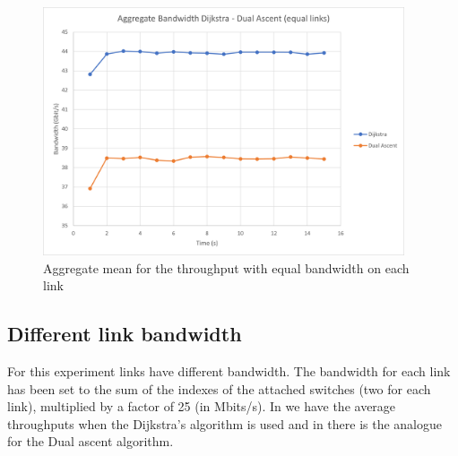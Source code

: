 \begin{figure}[hbt]
	\centering
	\includegraphics[width=0.95\textwidth]{img/aggregate-band-eq.png}
	\caption{Aggregate mean for the throughput with equal bandwidth on each
		link}\label{fig:band-aggregate-eq}
\end{figure}

\subsection{Different link bandwidth}

For this experiment links have different bandwidth. The bandwidth for each link
has been set to the sum of the indexes of the attached switches (two for each
link), multiplied by a factor of 25 (in Mbits/s). In
 we have the average throughputs when the
Dijkstra's algorithm is used and in  there is the
analogue for the Dual ascent algorithm.

